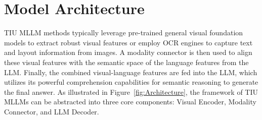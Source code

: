 \section{Model Architecture}
\label{sec:model_architecture}



TIU MLLM methods typically leverage pre-trained general visual foundation models to extract robust visual features or employ OCR engines to capture text and layout information from images. A modality connector is then used to align these visual features with the semantic space of the language features from the LLM. Finally, the combined visual-language features are fed into the LLM, which utilizes its powerful comprehension capabilities for semantic reasoning to generate the final answer.
As illustrated in Figure~\ref{fig:Architecture}, the framework of TIU MLLMs can be abstracted into three core components: Visual Encoder, Modality Connector, and LLM Decoder. 


